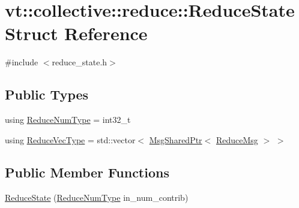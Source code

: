 \hypertarget{structvt_1_1collective_1_1reduce_1_1_reduce_state}{}\section{vt\+:\+:collective\+:\+:reduce\+:\+:Reduce\+State Struct Reference}
\label{structvt_1_1collective_1_1reduce_1_1_reduce_state}


{\ttfamily \#include $<$reduce\+\_\+state.\+h$>$}

\subsection*{Public Types}
\begin{DoxyCompactItemize}
\item 
using \hyperlink{structvt_1_1collective_1_1reduce_1_1_reduce_state_ae83d217c90b8a8895ca998d7ea9c49e4}{Reduce\+Num\+Type} = int32\+\_\+t
\item 
using \hyperlink{structvt_1_1collective_1_1reduce_1_1_reduce_state_afea0a5b0e2cdfd86417394d044e440db}{Reduce\+Vec\+Type} = std\+::vector$<$ \hyperlink{namespacevt_ab2b3d506ec8e8d1540aede826d84a239}{Msg\+Shared\+Ptr}$<$ \hyperlink{structvt_1_1collective_1_1reduce_1_1_reduce_msg}{Reduce\+Msg} $>$ $>$
\end{DoxyCompactItemize}
\subsection*{Public Member Functions}
\begin{DoxyCompactItemize}
\item 
\hyperlink{structvt_1_1collective_1_1reduce_1_1_reduce_state_abc38bf2a33153df0f405b5a812cbd2e9}{Reduce\+State} (\hyperlink{structvt_1_1collective_1_1reduce_1_1_reduce_state_ae83d217c90b8a8895ca998d7ea9c49e4}{Reduce\+Num\+Type} in\+\_\+num\+\_\+contrib)
\end{DoxyCompactItemize}
